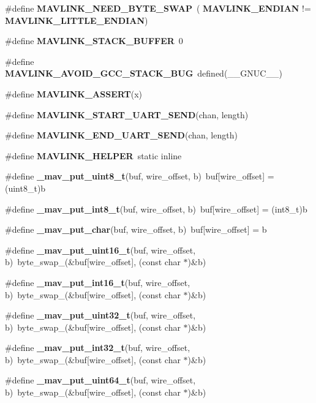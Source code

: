 \begin{DoxyCompactItemize}
\item 
\#define \textbf{ M\+A\+V\+L\+I\+N\+K\+\_\+\+N\+E\+E\+D\+\_\+\+B\+Y\+T\+E\+\_\+\+S\+W\+AP}~(\textbf{ M\+A\+V\+L\+I\+N\+K\+\_\+\+E\+N\+D\+I\+AN} != \textbf{ M\+A\+V\+L\+I\+N\+K\+\_\+\+L\+I\+T\+T\+L\+E\+\_\+\+E\+N\+D\+I\+AN})
\item 
\#define \textbf{ M\+A\+V\+L\+I\+N\+K\+\_\+\+S\+T\+A\+C\+K\+\_\+\+B\+U\+F\+F\+ER}~0
\item 
\#define \textbf{ M\+A\+V\+L\+I\+N\+K\+\_\+\+A\+V\+O\+I\+D\+\_\+\+G\+C\+C\+\_\+\+S\+T\+A\+C\+K\+\_\+\+B\+UG}~defined(\+\_\+\+\_\+\+G\+N\+U\+C\+\_\+\+\_\+)
\item 
\#define \textbf{ M\+A\+V\+L\+I\+N\+K\+\_\+\+A\+S\+S\+E\+RT}(x)
\item 
\#define \textbf{ M\+A\+V\+L\+I\+N\+K\+\_\+\+S\+T\+A\+R\+T\+\_\+\+U\+A\+R\+T\+\_\+\+S\+E\+ND}(chan,  length)
\item 
\#define \textbf{ M\+A\+V\+L\+I\+N\+K\+\_\+\+E\+N\+D\+\_\+\+U\+A\+R\+T\+\_\+\+S\+E\+ND}(chan,  length)
\item 
\#define \textbf{ M\+A\+V\+L\+I\+N\+K\+\_\+\+H\+E\+L\+P\+ER}~static inline
\item 
\#define \textbf{ \+\_\+mav\+\_\+put\+\_\+uint8\+\_\+t}(buf,  wire\+\_\+offset,  b)~buf[wire\+\_\+offset] = (uint8\+\_\+t)b
\item 
\#define \textbf{ \+\_\+mav\+\_\+put\+\_\+int8\+\_\+t}(buf,  wire\+\_\+offset,  b)~buf[wire\+\_\+offset] = (int8\+\_\+t)b
\item 
\#define \textbf{ \+\_\+mav\+\_\+put\+\_\+char}(buf,  wire\+\_\+offset,  b)~buf[wire\+\_\+offset] = b
\item 
\#define \textbf{ \+\_\+mav\+\_\+put\+\_\+uint16\+\_\+t}(buf,  wire\+\_\+offset,  b)~byte\+\_\+swap\+\_(\&buf[wire\+\_\+offset], (const char $\ast$)\&b)
\item 
\#define \textbf{ \+\_\+mav\+\_\+put\+\_\+int16\+\_\+t}(buf,  wire\+\_\+offset,  b)~byte\+\_\+swap\+\_(\&buf[wire\+\_\+offset], (const char $\ast$)\&b)
\item 
\#define \textbf{ \+\_\+mav\+\_\+put\+\_\+uint32\+\_\+t}(buf,  wire\+\_\+offset,  b)~byte\+\_\+swap\+\_(\&buf[wire\+\_\+offset], (const char $\ast$)\&b)
\item 
\#define \textbf{ \+\_\+mav\+\_\+put\+\_\+int32\+\_\+t}(buf,  wire\+\_\+offset,  b)~byte\+\_\+swap\+\_(\&buf[wire\+\_\+offset], (const char $\ast$)\&b)
\item 
\#define \textbf{ \+\_\+mav\+\_\+put\+\_\+uint64\+\_\+t}(buf,  wire\+\_\+offset,  b)~byte\+\_\+swap\+\_(\&buf[wire\+\_\+offset], (const char $\ast$)\&b)

\end{DoxyCompactItemize}
